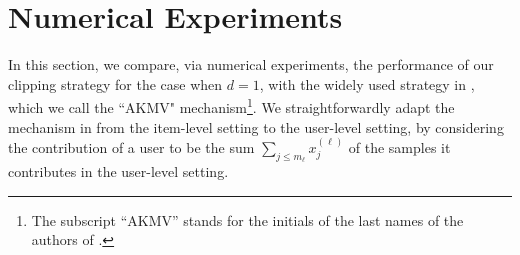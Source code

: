 \documentclass[conference,letterpaper]{IEEEtran}
\theoremstyle{remark}
\theoremstyle{definition}
\begin{document}
%
%			
%			
%			
%			
%			
%			
%			
%			
%			
%			


\section{Numerical Experiments}
\label{sec:experiments}
In this section, we compare, via numerical experiments, the performance of our clipping strategy for the case when $d=1$, with the widely used strategy in \cite[Sec. 3]{amin}, which we call the ``AKMV" mechanism\footnote{The subscript ``AKMV'' stands for the initials of the last names of the authors of \cite{amin}.}. We straightforwardly adapt the mechanism in \cite{amin} from the item-level setting to the user-level setting, by considering the contribution of a user to be the sum $\sum_{j\leq m_\ell} x_j^{(\ell)}$ of the samples it contributes in the user-level setting. 
\end{document}
